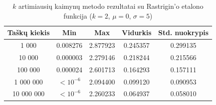 \begin{table}[H]
    \centering
    \begin{tabular}{|c|c|c|c|c|}
        \hline
        \textbf{Taškų kiekis} & \textbf{Min} & \textbf{Max} & \textbf{Vidurkis} & \textbf{Std. nuokrypis} \\ \hline
        1 000        & 0.008276 & 2.877923 & 0.245357 & 0.299135 \\ \hline
        10 000       & 0.000003 & 2.279146 & 0.218244 & 0.215566 \\ \hline
        100 000      & 0.000024 & 2.601713 & 0.164293 & 0.157111 \\ \hline
        1 000 000    & $<10^{-6}$ & 2.094400 & 0.099120 & 0.090953 \\ \hline
        10 000 000   & $<10^{-6}$ & 2.260233 & 0.064937 & 0.058010 \\ \hline
    \end{tabular}
    \caption{$k$ artimiausių kaimynų metodo rezultatai su Rastrigin'o etalono funkcija ($k = 2$, $\mu = 0$, $\sigma = 5$)}
\end{table}